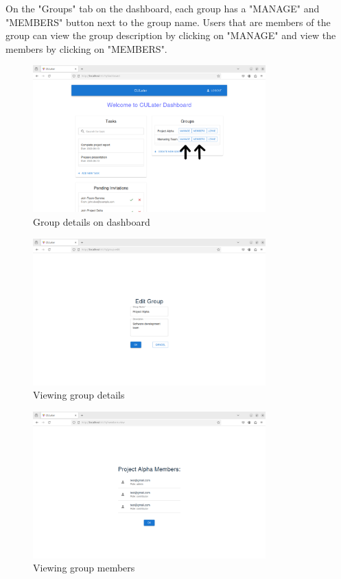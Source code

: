 \documentclass{scrreprt}
\begin{document}
On the "Groups" tab on the dashboard, each group has a "MANAGE" and "MEMBERS" button next to the group name. Users that are members of the group can view the group description by clicking on "MANAGE" and view the members by clicking on "MEMBERS".\\
\begin{figure}[htbp]
        \centering
        \includegraphics[width=0.8\textwidth]{group_details.png}
	\caption{Group details on dashboard}
	\label{fig:my_label}
\end{figure}
\begin{figure}[htbp]
        \centering
        \includegraphics[width=0.8\textwidth]{group_update.png}
	\caption{Viewing group details}
	\label{fig:my_label}
\end{figure}
\begin{figure}[htbp]
        \centering
        \includegraphics[width=0.8\textwidth]{show_members.png}
	\caption{Viewing group members}
	\label{fig:my_label}
\end{figure}
\end{document}
